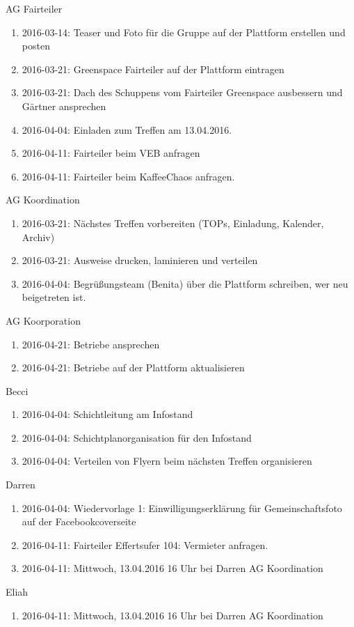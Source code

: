 \documentclass{scrreprt}
\begin{document}
{AG Fairteiler
\begin{enumerate}
	\item 2016-03-14: Teaser und Foto für die Gruppe auf der Plattform erstellen und posten
	\item 2016-03-21: Greenspace Fairteiler auf der Plattform eintragen
	\item 2016-03-21: Dach des Schuppens vom Fairteiler Greenspace ausbessern und Gärtner ansprechen
	\item 2016-04-04: Einladen zum Treffen am 13.04.2016.
	\item 2016-04-11: Fairteiler beim VEB anfragen
	\item 2016-04-11: Fairteiler beim KaffeeChaos anfragen.
\end{enumerate}
AG Koordination
\begin{enumerate}
	\item 2016-03-21: Nächstes Treffen vorbereiten (TOPs, Einladung, Kalender, Archiv)
	\item 2016-03-21: Ausweise drucken, laminieren und verteilen
	\item 2016-04-04: Begrüßungsteam (Benita) über die Plattform schreiben, wer neu beigetreten ist.
\end{enumerate}
AG Koorporation
\begin{enumerate}
	\item 2016-04-21: Betriebe ansprechen
	\item 2016-04-21: Betriebe auf der Plattform aktualisieren
\end{enumerate}
Becci
\begin{enumerate}
    \item 2016-04-04: Schichtleitung am Infostand
    \item 2016-04-04: Schichtplanorganisation für den Infostand
    \item 2016-04-04: Verteilen von Flyern beim nächsten Treffen organisieren
\end{enumerate}
Darren
\begin{enumerate}
	\item 2016-04-04: Wiedervorlage 1: Einwilligungserklärung für Gemeinschaftsfoto auf der Facebookcoverseite
	\item 2016-04-11: Fairteiler Effertsufer 104: Vermieter anfragen.
	\item 2016-04-11: Mittwoch, 13.04.2016 16 Uhr bei Darren AG Koordination
\end{enumerate} 
Eliah
\begin{enumerate}
	\item 2016-04-11: Mittwoch, 13.04.2016 16 Uhr bei Darren AG Koordination

\end{enumerate}}
\end{document}
